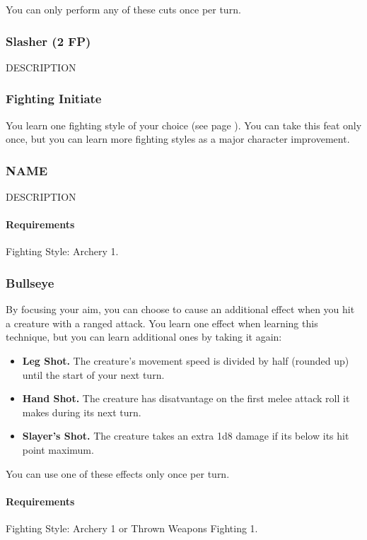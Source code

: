     You can only perform any of these cuts once per turn.
\subsubsection{Slasher (2 FP)} \label{feat::slasher}
    DESCRIPTION

\subsubsection{Fighting Initiate} \label{feat::fightinginitiate}
    You learn one fighting style of your choice (see page \pageref{ssec::fightingstyles}).
    You can take this feat only once, but you can learn more fighting styles as a major character improvement.
\subsubsection{NAME} \label{feat::name}
    DESCRIPTION
    \paragraph{Requirements} Fighting Style: Archery 1.
\subsubsection{Bullseye} \label{feat::bullseye}
    By focusing your aim, you can choose to cause an additional effect when you hit a creature with a ranged attack.
    You learn one effect when learning this technique, but you can learn additional ones by taking it again:
    \begin{itemize}
        \item \textbf{Leg Shot.} The creature's movement speed is divided by half (rounded up) until the start of your next turn.
        \item \textbf{Hand Shot.} The creature has disatvantage on the first melee attack roll it makes during its next turn.
        \item \textbf{Slayer's Shot.} The creature takes an extra 1d8 damage if its below its hit point maximum.
    \end{itemize}

    You can use one of these effects only once per turn.
    \paragraph{Requirements} Fighting Style: Archery 1 or Thrown Weapons Fighting 1.

